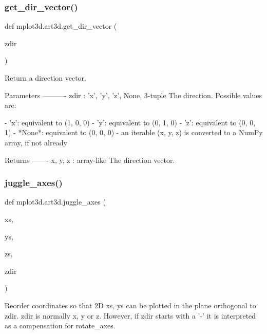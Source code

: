 \subsubsection{\texorpdfstring{get\+\_\+dir\+\_\+vector()}{get\_dir\_vector()}}
{\footnotesize\ttfamily def mplot3d.\+art3d.\+get\+\_\+dir\+\_\+vector (\begin{DoxyParamCaption}\item[{}]{zdir }\end{DoxyParamCaption})}

\begin{DoxyVerb}Return a direction vector.

Parameters
----------
zdir : {'x', 'y', 'z', None, 3-tuple}
    The direction. Possible values are:

    - 'x': equivalent to (1, 0, 0)
    - 'y': equivalent to (0, 1, 0)
    - 'z': equivalent to (0, 0, 1)
    - *None*: equivalent to (0, 0, 0)
    - an iterable (x, y, z) is converted to a NumPy array, if not already

Returns
-------
x, y, z : array-like
    The direction vector.
\end{DoxyVerb}
 \mbox{\label{namespacemplot3d_1_1art3d_ab3ce3a08ef64e17416f8ed492862e739}} 
\subsubsection{\texorpdfstring{juggle\+\_\+axes()}{juggle\_axes()}}
{\footnotesize\ttfamily def mplot3d.\+art3d.\+juggle\+\_\+axes (\begin{DoxyParamCaption}\item[{}]{xs,  }\item[{}]{ys,  }\item[{}]{zs,  }\item[{}]{zdir }\end{DoxyParamCaption})}

\begin{DoxyVerb}Reorder coordinates so that 2D xs, ys can be plotted in the plane
orthogonal to zdir. zdir is normally x, y or z. However, if zdir
starts with a '-' it is interpreted as a compensation for rotate_axes.
\end{DoxyVerb}
 \mbox{\label{namespacemplot3d_1_1art3d_ab5414deecc5c73ab6130fee1cbd5528f}} 
